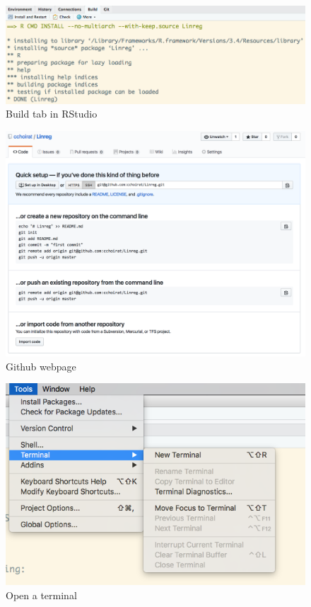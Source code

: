 \documentclass[]{book}
\theoremstyle{definition}
\theoremstyle{definition}
\theoremstyle{definition}
\theoremstyle{remark}
\begin{document}
\begin{figure}

{\centering \includegraphics{images/ch3_pkg_6_install} 

}

\caption{Build tab in RStudio}\label{fig:pkg6}
\end{figure}

\begin{figure}

{\centering \includegraphics{images/ch3_pkg_7_github} 

}

\caption{Github webpage}\label{fig:pkg7}
\end{figure}

\begin{figure}

{\centering \includegraphics{images/ch3_pkg_8_terminal} 

}

\caption{Open a terminal}\label{fig:term}
\end{figure}
\end{document}
